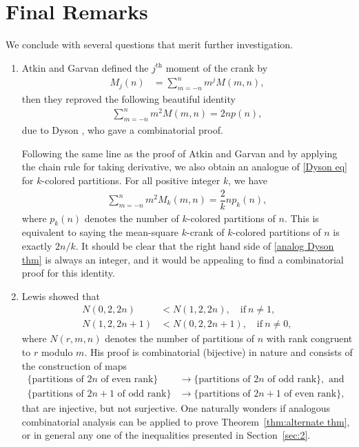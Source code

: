 \documentclass[12pt]{amsart}
\numberwithin{equation}{section}
\theoremstyle{plain}
\theoremstyle{definition}
\begin{document}
\section{Final Remarks}\label{sec4}
We conclude with several questions that merit further investigation.
\begin{enumerate}[1)]
\item Atkin and Garvan \cite{AG} defined the $j^{\text{th}}$ moment of the crank by
\begin{align*}
M_{j}(n) &=\sum_{m=-n}^{n}m^{j}M(m,n),
\end{align*}
then they reproved the following beautiful identity
\begin{align}\label{Dyson eq}
\sum_{m=-n}^{n}m^{2}M(m,n)=2np(n),
\end{align}
due to Dyson \cite{Dys2}, who gave a combinatorial proof.

Following the same line as the proof of Atkin and Garvan and by applying the chain rule for taking derivative, we also obtain an analogue of \eqref{Dyson eq} for $k$-colored partitions.
For all positive integer $k$, we have
\begin{align}\label{analog Dyson thm}
\sum_{m=-n}^{n}m^{2}M_{k}(m,n)=\dfrac{2}{k}np_{k}(n),
\end{align}
where $p_{k}(n)$ denotes the number of $k$-colored partitions of $n$. This is equivalent to saying the mean-square $k$-crank of $k$-colored partitions of $n$ is exactly $2n/k$. It should be clear that the right hand side of \eqref{analog Dyson thm} is always an integer, and it would be appealing to find a combinatorial proof for this identity.

\item Lewis \cite{Lew} showed that
\begin{align*}
N(0,2,2n) &<N(1,2,2n),\quad \textrm{if}~n\neq1,\\
N(1,2,2n+1) &<N(0,2,2n+1),\quad \textrm{if}~n\neq0,
\end{align*}
where $N(r,m,n)$ denotes the number of partitions of $n$ with rank congruent to $r$ modulo $m$. His proof is combinatorial (bijective) in nature and consists of the construction of maps
\begin{align*}
\{\textrm{partitions~of~$2n$~of~even~rank}\} &\rightarrow\{\textrm{partitions~of~$2n$~of~odd~rank}\}, \text{ and }\\
\{\textrm{partitions~of~$2n+1$~of~odd~rank}\} &\rightarrow\{\textrm{partitions~of~$2n+1$~of~even~rank}\},
\end{align*}
that are injective, but not surjective. One naturally wonders if analogous combinatorial analysis can be applied to prove Theorem~\ref{thm:alternate thm}, or in general any one of the inequalities presented in Section~\ref{sec:2}.


\end{enumerate}
\end{document}
